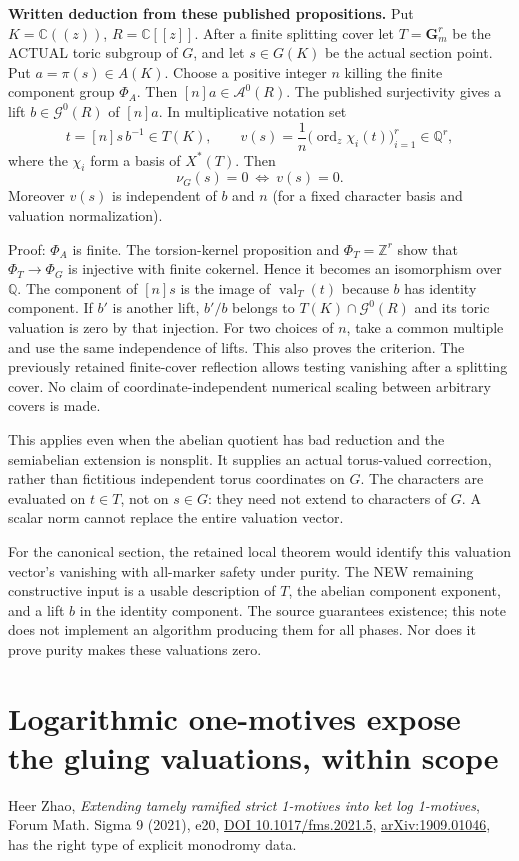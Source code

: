 \documentclass{article}
\newcommand{\Q}{\mathbb Q}\newcommand{\C}{\mathbb C}\newcommand{\Z}{\mathbb Z}
\begin{document}
\textbf{Written deduction from these published propositions.} Put $K=\C((z))$, $R=\C[[z]]$. After a finite splitting cover let $T=\mathbf G_m^r$ be the ACTUAL toric subgroup of $G$, and let $s\in G(K)$ be the actual section point. Put $a=\pi(s)\in A(K)$. Choose a positive integer $n$ killing the finite component group $\Phi_A$. Then $[n]a\in\mathcal A^0(R)$. The published surjectivity gives a lift $b\in\mathcal G^0(R)$ of $[n]a$. In multiplicative notation set
\[
 t=[n]s\,b^{-1}\in T(K),\qquad
 v(s)=\frac1n\bigl(\operatorname{ord}_z\chi_i(t)\bigr)_{i=1}^r\in\Q^r,
\]
where the $\chi_i$ form a basis of $X^*(T)$. Then
\[
 \nu_G(s)=0\ \Longleftrightarrow\ v(s)=0.
\]
Moreover $v(s)$ is independent of $b$ and $n$ (for a fixed character basis and valuation normalization).

Proof: $\Phi_A$ is finite. The torsion-kernel proposition and $\Phi_T=\Z^r$ show that $\Phi_T\to\Phi_G$ is injective with finite cokernel. Hence it becomes an isomorphism over $\Q$. The component of $[n]s$ is the image of $\operatorname{val}_T(t)$ because $b$ has identity component. If $b'$ is another lift, $b'/b$ belongs to $T(K)\cap\mathcal G^0(R)$ and its toric valuation is zero by that injection. For two choices of $n$, take a common multiple and use the same independence of lifts. This also proves the criterion. The previously retained finite-cover reflection allows testing vanishing after a splitting cover. No claim of coordinate-independent numerical scaling between arbitrary covers is made.

This applies even when the abelian quotient has bad reduction and the semiabelian extension is nonsplit. It supplies an actual torus-valued correction, rather than fictitious independent torus coordinates on $G$. The characters are evaluated on $t\in T$, not on $s\in G$: they need not extend to characters of $G$. A scalar norm cannot replace the entire valuation vector.

For the canonical section, the retained local theorem would identify this valuation vector's vanishing with all-marker safety under purity. The NEW remaining constructive input is a usable description of $T$, the abelian component exponent, and a lift $b$ in the identity component. The source guarantees existence; this note does not implement an algorithm producing them for all phases. Nor does it prove purity makes these valuations zero.

\section{Logarithmic one-motives expose the gluing valuations, within scope}
Heer Zhao, \emph{Extending tamely ramified strict 1-motives into ket log 1-motives}, Forum Math. Sigma 9 (2021), e20, \href{https://doi.org/10.1017/fms.2021.5}{DOI 10.1017/fms.2021.5}, \href{https://arxiv.org/abs/1909.01046}{arXiv:1909.01046}, has the right type of explicit monodromy data.
\end{document}
